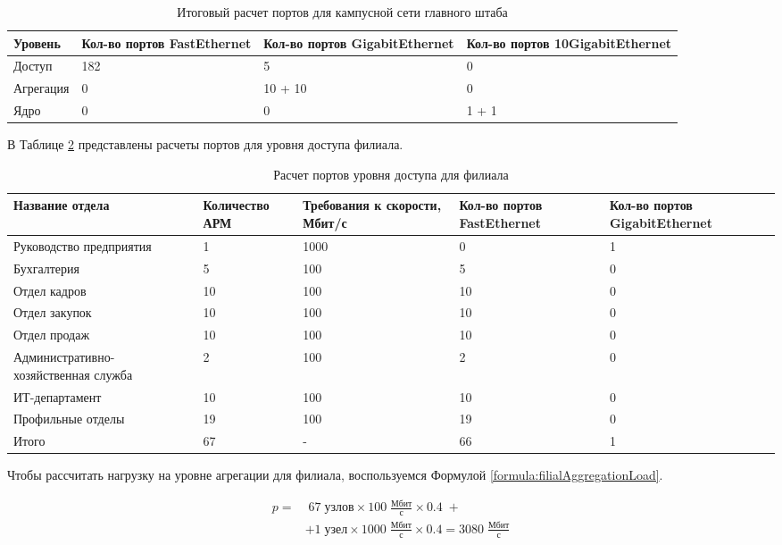 \documentclass[14pt, a4paper]{extarticle}
\numberwithin{equation}{section}
\begin{document}
\begin{table}[H]
\centering
\small
\caption{Итоговый расчет портов для кампусной сети главного штаба}
\begin{tabular}{|m{2cm}|m{4cm}|m{3cm}|m{3.5cm}|}
\hline
\textbf{Уровень} & \textbf{Кол-во портов FastEthernet} & \textbf{Кол-во портов GigabitEthernet} & \textbf{Кол-во портов 10GigabitEthernet} \\
\hline
Доступ & 182 & 5 & 0 \\
\hline
Агрегация & 0 & 10 + 10 & 0 \\
\hline
Ядро & 0 & 0 & 1 + 1 \\
\hline
\end{tabular}
\label{table:mainDepCampusNet}
\end{table}


        

В Таблице \ref{table:filialAccessLevel} представлены расчеты портов для уровня доступа 
филиала.

\begin{table}[H]
\centering
\small
\caption{Расчет портов уровня доступа для филиала}
\begin{tabular}{|m{4cm}|m{2.5cm}|m{2.5cm}|m{2.5cm}|m{3cm}|}
\hline
\textbf{Название отдела} & \textbf{Количество АРМ} & \textbf{Требования к скорости, Мбит/с} & \textbf{Кол-во портов FastEthernet} & \textbf{Кол-во портов GigabitEthernet} \\
\hline
Руководство предприятия & 1 & 1000 & 0 & 1 \\
\hline
Бухгалтерия & 5 & 100 & 5 & 0 \\
\hline
Отдел кадров & 10 & 100 & 10 & 0 \\
\hline
Отдел закупок & 10 & 100 & 10 & 0 \\
\hline
Отдел продаж & 10 & 100 & 10 & 0 \\
\hline
Административно-хозяйственная служба & 2 & 100 & 2 & 0 \\
\hline
ИТ-департамент & 10 & 100 & 10 & 0 \\
\hline
Профильные отделы & 19 & 100 & 19 & 0 \\
\hline
Итого & 67 & - & 66 & 1 \\
\hline
\end{tabular}
\label{table:filialAccessLevel}
\end{table}

Чтобы рассчитать нагрузку на уровне агрегации для 
филиала, воспользуемся Формулой \ref{formula:filialAggregationLoad}.

\begin{equation}
\begin{aligned}
p = & \; 67 \; \text{узлов} \times 100\;\frac{\text{Мбит}}{\text{с}} \times 0.4 \; + \\
& + 1 \; \text{узел} \times 1000\;\frac{\text{Мбит}}{\text{с}} \times 0.4 = 3080\;\frac{\text{Мбит}}{\text{с}}
\end{aligned}
\label{formula:filialAggregationLoad}
\end{equation}
\end{document}
